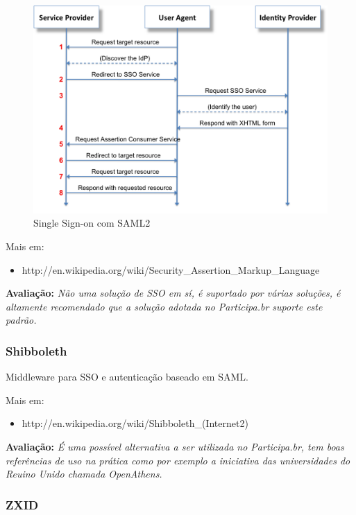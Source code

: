 \documentclass[11pt]{article}
\begin{document}
\begin{figure}[h]
\center
\includegraphics[scale=0.5]{saml2.png}
\caption{Single Sign-on com SAML2}
\label{fig:saml2}
\end{figure}

Mais em:
\begin{itemize}
  \item{http://en.wikipedia.org/wiki/Security\_Assertion\_Markup\_Language}
\end{itemize}

{\bf Avaliação:} {\it Não uma solução de SSO em sí, é suportado por várias
soluções, é altamente recomendado que a solução adotada no Participa.br
suporte este padrão.}

\subsubsection{Shibboleth}

Middleware para SSO e autenticação baseado em SAML.

Mais em:
\begin{itemize}
  \item{http://en.wikipedia.org/wiki/Shibboleth\_(Internet2)}
\end{itemize}

{\bf Avaliação:} {\it É uma possível alternativa a ser utilizada no
Participa.br, tem boas referências de uso na prática como por exemplo a
iniciativa das universidades do Reuino Unido chamada OpenAthens.}

\subsubsection{ZXID}
\end{document}
